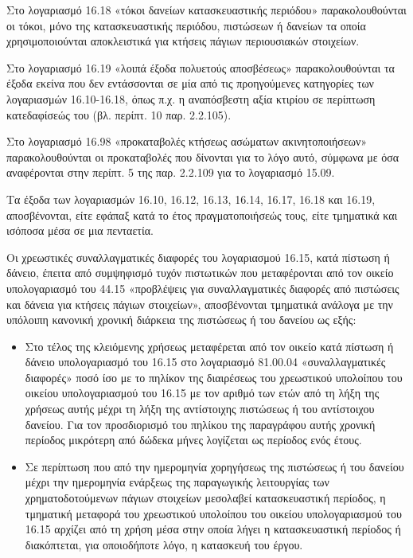 \documentclass[A4,10pt,greek]{book}
\begin{document}
\begin{enumerate}
Στο λογαριασμό 16.18 «τόκοι δανείων κατασκευαστικής περιόδου» παρακολουθούνται οι τόκοι, μόνο της κατασκευαστικής περιόδου, πιστώσεων ή δανείων τα οποία χρησιμοποιούνται αποκλειστικά για κτήσεις πάγιων περιουσιακών στοιχείων.

Στο λογαριασμό 16.19 «λοιπά έξοδα πολυετούς αποσβέσεως» παρακολουθούνται τα έξοδα εκείνα που δεν εντάσσονται σε μία από τις προηγούμενες κατηγορίες των λογαριασμών 16.10-16.18, όπως π.χ. η αναπόσβεστη αξία κτιρίου σε περίπτωση κατεδαφίσεώς του (βλ. περίπτ. 10 παρ. 2.2.105).

Στο λογαριασμό 16.98 «προκαταβολές κτήσεως ασώματων ακινητοποιήσεων» παρακολουθούνται οι προκαταβολές που δίνονται για το λόγο αυτό, σύμφωνα με όσα αναφέρονται στην περίπτ. 5 της παρ. 2.2.109 για το λογαριασμό 15.09.

Τα έξοδα των λογαριασμών 16.10, 16.12, 16.13, 16.14, 16.17, 16.18 και 16.19, αποσβένονται, είτε εφάπαξ κατά το έτος πραγματοποιήσεώς τους, είτε τμηματικά και ισόποσα μέσα σε μια πενταετία.

Οι χρεωστικές συναλλαγματικές διαφορές του λογαριασμού 16.15, κατά πίστωση ή δάνειο, έπειτα από συμψηφισμό τυχόν πιστωτικών που μεταφέρονται από τον οικείο υπολογαριασμό του 44.15 «προβλέψεις για συναλλαγματικές διαφορές από πιστώσεις και δάνεια για κτήσεις πάγιων στοιχείων», αποσβένονται τμηματικά ανάλογα με την υπόλοιπη κανονική χρονική διάρκεια της πιστώσεως ή του δανείου ως εξής:

\begin{itemize}

\item Στο τέλος της κλειόμενης χρήσεως μεταφέρεται από τον οικείο κατά πίστωση ή δάνειο υπολογαριασμό του 16.15 στο λογαριασμό 81.00.04 «συναλλαγματικές διαφορές» ποσό ίσο με το πηλίκον της διαιρέσεως του χρεωστικού υπολοίπου του οικείου υπολογαριασμού του 16.15 με τον αριθμό των ετών από τη λήξη της χρήσεως αυτής μέχρι τη λήξη της αντίστοιχης πιστώσεως ή του αντίστοιχου δανείου. Για τον προσδιορισμό του πηλίκου της παραγράφου αυτής χρονική περίοδος μικρότερη από δώδεκα μήνες λογίζεται ως περίοδος ενός έτους.

\item Σε περίπτωση που από την ημερομηνία χορηγήσεως της πιστώσεως ή του δανείου μέχρι την ημερομηνία ενάρξεως της παραγωγικής λειτουργίας των χρηματοδοτούμενων πάγιων στοιχείων μεσολαβεί κατασκευαστική περίοδος, η τμηματική μεταφορά του χρεωστικού υπολοίπου του οικείου υπολογαριασμού του 16.15 αρχίζει από τη χρήση μέσα στην οποία λήγει η κατασκευαστική περίοδος ή διακόπτεται, για οποιοδήποτε λόγο, η κατασκευή του έργου.


\end{itemize}
\end{enumerate}
\end{document}
